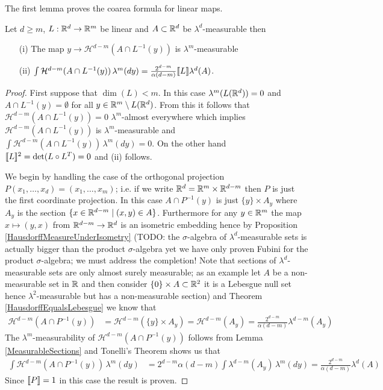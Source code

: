 The first lemma proves the coarea formula for linear maps.

\begin{lem}\label{CoareaFormulaLinearMaps}Let $d \geq m$, $L : \mathbb{R}^d \to \mathbb{R}^m$ be linear and $A \subset \mathbb{R}^d$ be $\lambda^d$-measurable then
\begin{itemize}
\item[(i)] The map $y \to \mathcal{H}^{d-m}(A \cap L^{-1}(y))$ is $\lambda^m$-measurable
\item[(ii)] $\int \mathcal{H}^{d-m}(A \cap L^{-1}(y)) \, \lambda^m(dy) = \frac{2^{d-m}} {\alpha(d-m)}\llbracket L \rrbracket \lambda^d(A)$.
\end{itemize}
\end{lem}
\begin{proof}
First suppose that $\dim(L) < m$.  In this case $\lambda^m(L(\mathbb{R}^d)) = 0$ and  $A \cap L^{-1}(y) = \emptyset$ for all $y \in \mathbb{R}^m \setminus L(\mathbb{R}^d)$.  From this it follows that
$\mathcal{H}^{d-m}(A \cap L^{-1}(y)) = 0$ $\lambda^m$-almost everywhere which implies $\mathcal{H}^{d-m}(A \cap L^{-1}(y))$ is $\lambda^m$-measurable and $\int \mathcal{H}^{d-m}(A \cap L^{-1}(y)) \, \lambda^m(dy) = 0$.  On the other hand $\llbracket L \rrbracket^2 = \det(L \circ L^T) = 0$ and (ii) follows.  

We begin by handling the case of the orthogonal projection $P(x_1, \dotsc, x_d) = (x_1, \dotsc, x_m)$; i.e. if we write $\mathbb{R}^d = \mathbb{R}^m \times \mathbb{R}^{d-m}$ then $P$ is just the first coordinate projection.  In this case $A \cap P^{-1}(y)$ is just $\lbrace y \rbrace \times A_y$ where $A_y$ is 
the section $\lbrace x \in \mathbb{R}^{d-m} \mid (x,y) \in A \rbrace$.  Furthermore for any $y \in \mathbb{R}^m$ the map $x \mapsto (y,x)$ from $\mathbb{R}^{d-m} \to \mathbb{R}^d$ is an isometric embedding hence
by Proposition \ref{HausdorffMeasureUnderIsometry} (TODO: the $\sigma$-algebra of $\lambda^d$-measurable sets is actually bigger than the product $\sigma$-algebra yet we have only proven Fubini for the product $\sigma$-algebra; we must address the completion!  Note that sections of $\lambda^d$-measurable sets are only almost surely measurable; as an example let $A$ be a non-measurable set in $\mathbb{R}$ and then consider $\lbrace 0 \rbrace \times A \subset \mathbb{R}^2$ it is a Lebesgue null set hence $\lambda^2$-measurable but has a non-measurable section)  and Theorem \ref{HausdorffEqualsLebesgue} we know that 
\begin{align*}
\mathcal{H}^{d-m}(A \cap P^{-1}(y)) &= \mathcal{H}^{d-m}(\lbrace y \rbrace \times A_y) = \mathcal{H}^{d-m}(A_y) = \frac{2^{d-m}}{\alpha(d-m)} \lambda^{d-m}(A_y) 
\end{align*}
The $\lambda^m$-measurability of $\mathcal{H}^{d-m}(A \cap P^{-1}(y))$ follows from Lemma \ref{MeasurableSections} and Tonelli's Theorem shows us that
\begin{align*}
\int \mathcal{H}^{d-m}(A \cap P^{-1}(y)) \, \lambda^m(dy) &= 2^{d-m} \alpha(d-m) \int \lambda^{d-m}(A_y) \, \lambda^m(dy) =  \frac{2^{d-m}} {\alpha(d-m)} \lambda^d(A)
\end{align*}
Since $\llbracket P \rrbracket = 1$ in this case the result is proven.


\end{proof}
